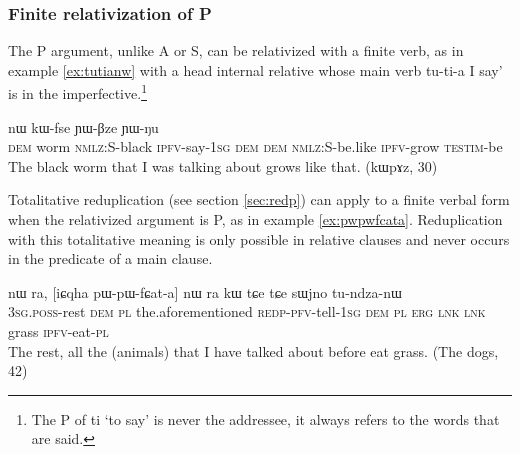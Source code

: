 \documentclass[oldfontcommands,oneside,a4paper,11pt]{article}
\newcommand{\ipa}[1]{{\phon #1}} %
\newcommand{\topic}{\textsc{dem}}
\begin{document}





 


\subsubsection{Finite relativization of P} \label{sec:p.non.nmlz}

The P argument, unlike A or S, can be relativized with a finite verb, as in example \ref{ex:tutianw} with a head internal relative whose main verb \ipa{tu-ti-a} I say' is in the imperfective.\footnote{The P of \ipa{ti} `to say' is never the addressee, it always refers to the words that are said.}

     \begin{exe}
   \ex \label{ex:tutianw}
 \gll [\ipa{nɯ}  	\textbf{\ipa{qajɯ}}  	\ipa{kɯ-ɲaʁ}  	\textbf{\ipa{tu-ti-a}}]  	\ipa{nɯ}  	\ipa{nɯ}  	\ipa{kɯ-fse}  	\ipa{ɲɯ-βze}  	\ipa{ɲɯ-ŋu}  \\
\textsc{dem} worm \textsc{nmlz:S}-black \textsc{ipfv}-say-\textsc{1sg} \topic{} \textsc{dem} \textsc{nmlz:S}-be.like \textsc{ipfv}-grow \textsc{testim}-be \\
\glt The black worm that I was talking about grows like that. (kɯpɤz, 30)
\end{exe}





Totalitative reduplication  (see section \ref{sec:redp}) can apply to a finite verbal form when the relativized argument is P, as in example \ref{ex:pwpwfcata}. Reduplication with this totalitative meaning is only possible in relative clauses and never occurs in the predicate of a main clause.

     \begin{exe}
   \ex \label{ex:pwpwfcata}
 \gll \ipa{ɯ-ro}   	\ipa{nɯ} \ipa{ra,}   	[\ipa{iɕqha}   	\ipa{pɯ-pɯ-fɕat-a}]   	\ipa{nɯ} \ipa{ra}  	\ipa{kɯ}   	\ipa{tɕe}   	\ipa{tɕe}   	\ipa{sɯjno}   	\ipa{tu-ndza-nɯ}    \\
 \textsc{3sg.poss}-rest \topic{} \textsc{pl} the.aforementioned \textsc{redp-pfv}-tell-\textsc{1sg} \topic{} \textsc{pl} \textsc{erg} \textsc{lnk} \textsc{lnk} grass \textsc{ipfv}-eat-\textsc{pl} \\
\glt The rest, all the (animals) that I have talked about before eat grass. (The dogs, 42)
\end{exe}
\end{document}
